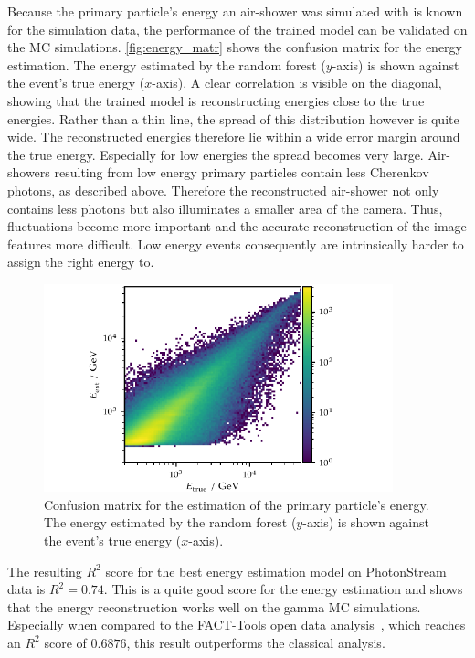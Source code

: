Because the primary particle's energy an air-shower was simulated with is known
for the simulation data, the performance of the trained model can be
validated on the MC simulations. \autoref{fig:energy_matr} shows the confusion
matrix for the energy estimation. The energy estimated by the random forest
($y$-axis) is shown against the event's true energy ($x$-axis). A clear
correlation is visible on the diagonal, showing that the trained model is
reconstructing energies close to the true energies. Rather than a thin line,
the spread of this distribution however is quite wide. The reconstructed
energies therefore lie within a wide error margin around the true energy.
Especially for low energies the spread becomes very large. Air-showers
resulting from low energy primary particles contain less Cherenkov photons, as
described above. Therefore the reconstructed air-shower not only contains less
photons but also illuminates a smaller area of the camera. Thus, fluctuations
become more important and the accurate reconstruction of the image features more
difficult. Low energy events consequently are intrinsically harder to assign
the right energy to.
%
\begin{figure}
  \centering
  \includegraphics[width=0.9\textwidth]{Plots/results/DBSCAN/energy_migration.pdf}
  \caption{Confusion matrix for the estimation of the primary particle's energy. The energy estimated by the random forest ($y$-axis) is shown against the event's true energy ($x$-axis).}
  \label{fig:energy_matr}
\end{figure}
%
The resulting $R^2$ score for the best energy estimation model on PhotonStream
data is $R^2 = 0.74$. This is a quite good score for the energy estimation and
shows that the energy reconstruction works well on the gamma MC simulations.
Especially when compared to the FACT-Tools open data analysis~\cite{openana},
which reaches an $R^2$ score of $0.6876$, this result outperforms the
classical analysis.
%


